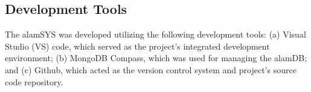 \subsection{Development Tools}
\label{subsec:dev_tools}

The alamSYS was developed utilizing the following development tools: (a) Visual Studio (VS) code, 
which served as the project’s integrated development environment; (b) MongoDB Compass, which was used 
for managing the alamDB; and (c) Github, which acted as the version control system and project’s 
source code repository.